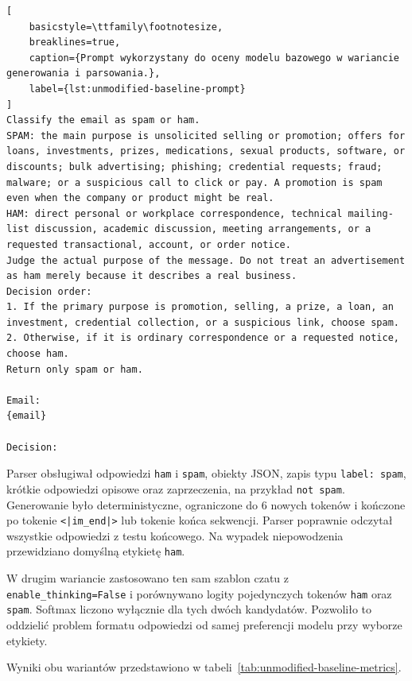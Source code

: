 \begin{lstlisting}[
    basicstyle=\ttfamily\footnotesize,
    breaklines=true,
    caption={Prompt wykorzystany do oceny modelu bazowego w wariancie generowania i parsowania.},
    label={lst:unmodified-baseline-prompt}
]
Classify the email as spam or ham.
SPAM: the main purpose is unsolicited selling or promotion; offers for loans, investments, prizes, medications, sexual products, software, or discounts; bulk advertising; phishing; credential requests; fraud; malware; or a suspicious call to click or pay. A promotion is spam even when the company or product might be real.
HAM: direct personal or workplace correspondence, technical mailing-list discussion, academic discussion, meeting arrangements, or a requested transactional, account, or order notice.
Judge the actual purpose of the message. Do not treat an advertisement as ham merely because it describes a real business.
Decision order:
1. If the primary purpose is promotion, selling, a prize, a loan, an investment, credential collection, or a suspicious link, choose spam.
2. Otherwise, if it is ordinary correspondence or a requested notice, choose ham.
Return only spam or ham.

Email:
{email}

Decision:
\end{lstlisting}

Parser obsługiwał odpowiedzi \texttt{ham} i \texttt{spam}, obiekty JSON, zapis
typu \texttt{label: spam}, krótkie odpowiedzi opisowe oraz zaprzeczenia, na
przykład \texttt{not spam}. Generowanie było deterministyczne, ograniczone do 6 nowych
tokenów i kończone po tokenie \texttt{<|im\_end|>} lub tokenie końca sekwencji.
Parser poprawnie odczytał wszystkie odpowiedzi z testu końcowego. Na wypadek
niepowodzenia przewidziano domyślną etykietę \texttt{ham}.

W drugim wariancie zastosowano ten sam szablon czatu z
\texttt{enable\_thinking=False} i porównywano logity pojedynczych tokenów
\texttt{ham} oraz \texttt{spam}. Softmax liczono wyłącznie dla tych dwóch
kandydatów. Pozwoliło to oddzielić problem formatu odpowiedzi od samej
preferencji modelu przy wyborze etykiety.

Wyniki obu wariantów przedstawiono w
tabeli~\ref{tab:unmodified-baseline-metrics}.

\begin{table}[htbp]
\centering
\small
\resizebox{\textwidth}{!}{}
\caption{Wyniki modelu bazowego bez dostrajania. Wartości podano w procentach;
kreska oznacza metrykę nieokreśloną dla zbioru jednoklasowego.}
\label{tab:unmodified-baseline-metrics}
\end{table}


